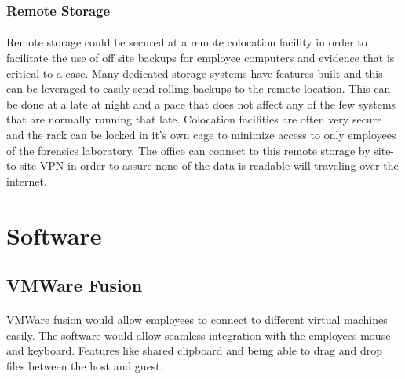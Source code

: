 \documentclass{article}
\begin{document}
\subsubsection{Remote Storage}
\paragraph{}
Remote storage could be secured at a remote colocation facility in order to facilitate the use of off site backups for employee computers and evidence that is critical to a case. 
Many dedicated storage systems have features built and this can be leveraged to easily send rolling backups to the remote location. 
This can be done at a late at night and a pace that does not affect any of the few systems that are normally running that late. 
Colocation facilities are often very secure and the rack can be locked in it's own cage to minimize access to only employees of the forensics laboratory. 
The office can connect to this remote storage by site-to-site VPN in order to assure none of the data is readable will traveling over the internet. 


\section{Software}
\subsection{VMWare Fusion} 
\paragraph{}
VMWare fusion would allow employees to connect to different virtual machines easily.
The software would allow seamless integration with the employees mouse and keyboard. 
Features like shared clipboard and being able to drag and drop files between the host and guest.
\end{document}
